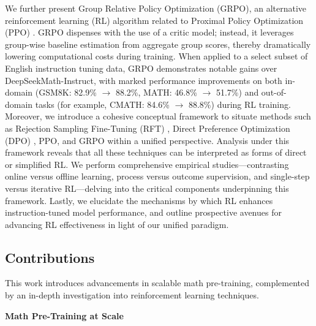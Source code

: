 We further present Group Relative Policy Optimization (GRPO), an alternative reinforcement learning (RL) algorithm related to Proximal Policy Optimization (PPO) \citep{schulman2017proximal}. GRPO dispenses with the use of a critic model; instead, it leverages group-wise baseline estimation from aggregate group scores, thereby dramatically lowering computational costs during training. When applied to a select subset of English instruction tuning data, GRPO demonstrates notable gains over DeepSeekMath-Instruct, with marked performance improvements on both in-domain (GSM8K: 82.9\% $\rightarrow$ 88.2\%, MATH: 46.8\% $\rightarrow$ 51.7\%) and out-of-domain tasks (for example, CMATH: 84.6\% $\rightarrow$ 88.8\%) during RL training. Moreover, we introduce a cohesive conceptual framework to situate methods such as Rejection Sampling Fine-Tuning (RFT) \citep{yuan2023scaling}, Direct Preference Optimization (DPO) \citep{dpo}, PPO, and GRPO within a unified perspective. Analysis under this framework reveals that all these techniques can be interpreted as forms of direct or simplified RL. We perform comprehensive empirical studies—contrasting online versus offline learning, process versus outcome supervision, and single-step versus iterative RL—delving into the critical components underpinning this framework. Lastly, we elucidate the mechanisms by which RL enhances instruction-tuned model performance, and outline prospective avenues for advancing RL effectiveness in light of our unified paradigm.

\subsection{Contributions}
This work introduces advancements in scalable math pre-training, complemented by an in-depth investigation into reinforcement learning techniques.

\textbf{Math Pre-Training at Scale}

